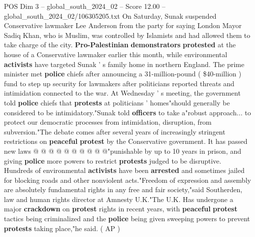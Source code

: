 \begin{textsample}{POS Dim 3 – global\_south\_2024\_02 – Score 12.00 – global\_south\_2024\_02/106305205.txt}
On Saturday, Sunak suspended Conservative lawmaker Lee Anderson from the party for saying London Mayor Sadiq Khan, who is Muslim, was controlled by Islamists and had allowed them to take charge of the city. \textbf{Pro-Palestinian} \textbf{demonstrators} \textbf{protested} at the house of a Conservative lawmaker earlier this month, while environmental \textbf{activists} have targeted Sunak ' s family home in northern England.
The prime minister met \textbf{police} chiefs after announcing a 31-million-pound ( \$40-million ) fund to step up security for lawmakers after politicians reported threats and intimidation connected to the war.
At Wednesday ' s meeting, the government told \textbf{police} chiefs that \textbf{protests} at politicians ' homes"should generally be considered to be intimidatory."Sunak told \textbf{officers} to take a"robust approach... to protect our democratic processes from intimidation, disruption, from subversion."The debate comes after several years of increasingly stringent restrictions on \textbf{peaceful} \textbf{protest} by the Conservative government.
It has passed new laws @ @ @ @ @ @ @ @ @ @"punishable by up to 10 years in prison, and giving \textbf{police} more powers to restrict \textbf{protests} judged to be disruptive.
Hundreds of environmental \textbf{activists} have been \textbf{arrested} and sometimes jailed for blocking roads and other nonviolent acts."Freedom of expression and assembly are absolutely fundamental rights in any free and fair society,"said Southerden, law and human rights director at Amnesty U.K."The U.K.
Has undergone a major \textbf{crackdown} on \textbf{protest} rights in recent years, with \textbf{peaceful} \textbf{protest} tactics being criminalized and the \textbf{police} being given sweeping powers to prevent \textbf{protests} taking place,"he said. ( AP )

\end{textsample}
